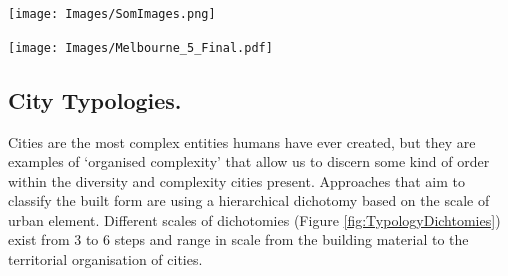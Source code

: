 \documentclass{nature}
\makeatletter
\renewenvironment*{figure}{\@float{figure}}{\end@float}
\makeatother
\begin{document}
\begin{figure}
\centering    
\texttt{[image: Images/SomImages.png]}  
\caption{\bf  A visualisation of the 2-dimensional 100x100 SOM trained with 1.7 million map images.  Each x,y point shows Left: a representative image associated with each node while nodes without associated images are shown in black and Right: number of images associated with each node. TODO, what is the Right, number of images, did this get implemented?}    
 \label{fig:somresults}  
\end{figure} 

\begin{figure}
\centering    
\texttt{[image: Images/Melbourne\_5\_Final.pdf]}  
\caption{\bf  Map of Melbourne, Australia with 24027 individual map segments classified and colour coded. Insert image on bottom left shows colour coding scheme for SOM x,y locations of Figure \ref{fig:somresults}. Note, the CBD region shows additional points due to inclusion of the 1000 circular sampling procedure in addition to the 23,027 locations sampled at 400m resolution. }    
 \label{fig:mel23000}  
\end{figure} 



\subsection{City Typologies.}\label{sec:introduction2}
Cities are the most complex entities humans have ever created, but they are examples of `organised complexity' that allow us to discern some kind of order within the diversity and complexity cities present\cite{Kropf2014}. Approaches that aim to classify the built form are using a hierarchical dichotomy based on the scale of urban element. Different scales of dichotomies (Figure \ref{fig:TypologyDichtomies}) exist from 3 to 6 steps and range in scale from the building material to the territorial organisation of cities\cite{Lynch1981,Conzen1960,Caniggi1979,Castex1980,Mouden1988,Allain2004}.
\end{document}
